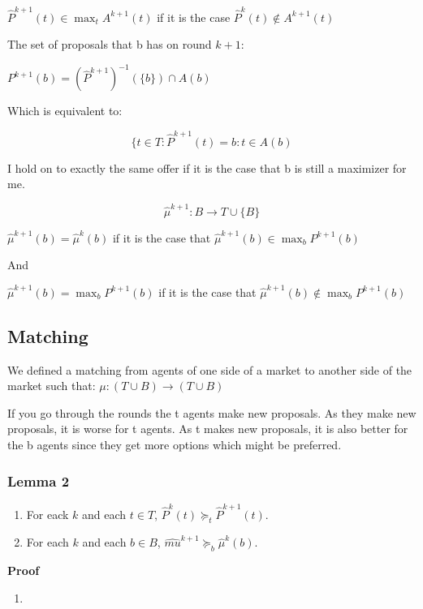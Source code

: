 \documentclass[11pt]{article}
\providecommand{\tightlist}{%
      \setlength{\itemsep}{0pt}\setlength{\parskip}{0pt}}
\begin{document}
\(\hat{P}^{k+1}(t) \in \max_t A^{k+1}(t)\) if it is the case
\(\hat{P}^k(t) \notin A^{k+1}(t)\)

The set of proposals that b has on round \(k+1\):

\(P^{k+1}(b) = (\hat{P}^{k+1})^{-1} (\{b\}) \cap A(b)\)

Which is equivalent to:

\[\{t \in T: \hat{P}^{k+1}(t) = b: t \in A(b)\]

    I hold on to exactly the same offer if it is the case that b is still a
maximizer for me.

\[\hat{\mu}^{k+1}: B \rightarrow T \cup \{B\}\]

\(\hat{\mu}^{k+1}(b) = \hat{\mu}^{k}(b)\) if it is the case that
\(\hat{\mu}^{k+1}(b) \in \max_b P^{k+1}(b)\)

And

\(\hat{\mu}^{k+1}(b) = \max_b P^{k+1}(b)\) if it is the case that
\(\hat{\mu}^{k+1}(b) \notin \max_b P^{k+1}(b)\)

    \subsection{Matching}\label{matching}

We defined a matching from agents of one side of a market to another
side of the market such that: \(\mu :(T \cup B) \rightarrow (T \cup B)\)

If you go through the rounds the t agents make new proposals. As they
make new proposals, it is worse for t agents. As t makes new proposals,
it is also better for the b agents since they get more options which
might be preferred.

\subsubsection{Lemma 2}\label{lemma-2}

\begin{enumerate}
\def\labelenumi{\arabic{enumi}.}
\tightlist
\item
  For eack \(k\) and each \(t \in T\),
  \(\hat{P}^k(t) \succeq_t \hat{P}^{k+1}(t).\)
\item
  For each \(k\) and each \(b \in B\),
  \(\hat{mu}^{k+1} \succeq_b \hat{\mu}^k(b).\)
\end{enumerate}

\textbf{Proof}

\begin{enumerate}
\def\labelenumi{(\arabic{enumi})}
\item
\end{enumerate}
\end{document}
